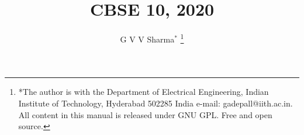 \documentclass[journal,12pt,twocolumn]{IEEEtran}
\begin{document}
\makeatletter
{}
\makeatother

\let\StandardTheFigure\thefigure
\let\vec\mathbf
\let\j\jmath
\renewcommand{\thefigure}{\theproblem}



\def\putbox#1#2#3{\makebox[0in][l]{\makebox[#1][l]{}\raisebox{\baselineskip}[0in][0in]{\raisebox{#2}[0in][0in]{#3}}}}
     \def\rightbox#1{\makebox[0in][r]{#1}}
     \def\centbox#1{\makebox[0in]{#1}}
     \def\topbox#1{\raisebox{-\baselineskip}[0in][0in]{#1}}
     \def\midbox#1{\raisebox{-0.5\baselineskip}[0in][0in]{#1}}

\vspace{3cm}

\title{
	CBSE 10, 2020
}
\author{ G V V Sharma$^{*}$%
	\thanks{*The author is with the Department
		of Electrical Engineering, Indian Institute of Technology, Hyderabad
		502285 India e-mail:  gadepall@iith.ac.in. All content in this manual is released under GNU GPL.  Free and open source.}
	
}	


%
%
%
\end{document}
